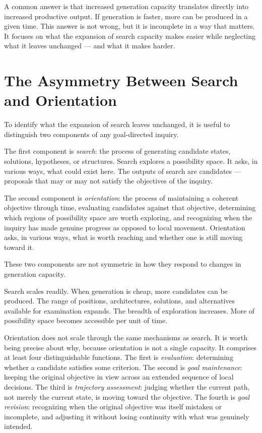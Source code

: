 A common answer is that increased generation capacity translates directly into
increased productive output. If generation is faster, more can be produced in
a given time. This answer is not wrong, but it is incomplete in a way that
matters. It focuses on what the expansion of search capacity makes easier while
neglecting what it leaves unchanged --- and what it makes harder.

\section{The Asymmetry Between Search and Orientation}

To identify what the expansion of search leaves unchanged, it is useful to
distinguish two components of any goal-directed inquiry.

The first component is \emph{search}: the process of generating candidate states,
solutions, hypotheses, or structures. Search explores a possibility space. It
asks, in various ways, what could exist here. The outputs of search are
candidates --- proposals that may or may not satisfy the objectives of the inquiry.

The second component is \emph{orientation}: the process of maintaining a coherent
objective through time, evaluating candidates against that objective, determining
which regions of possibility space are worth exploring, and recognizing when
the inquiry has made genuine progress as opposed to local movement. Orientation
asks, in various ways, what is worth reaching and whether one is still moving
toward it.

These two components are not symmetric in how they respond to changes in
generation capacity.

Search scales readily. When generation is cheap, more candidates can be produced.
The range of positions, architectures, solutions, and alternatives available for
examination expands. The breadth of exploration increases. More of possibility
space becomes accessible per unit of time.

Orientation does not scale through the same mechanisms as search. It is worth
being precise about why, because orientation is not a single capacity. It
comprises at least four distinguishable functions. The first is \emph{evaluation}:
determining whether a candidate satisfies some criterion. The second is
\emph{goal maintenance}: keeping the original objective in view across an
extended sequence of local decisions. The third is \emph{trajectory assessment}:
judging whether the current path, not merely the current state, is moving
toward the objective. The fourth is \emph{goal revision}: recognizing when
the original objective was itself mistaken or incomplete, and adjusting it
without losing continuity with what was genuinely intended.

